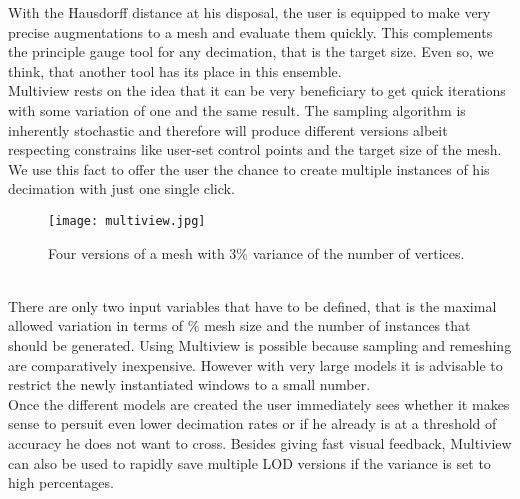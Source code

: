 With the Hausdorff distance at his disposal, the user is equipped to make very precise augmentations to a mesh and evaluate them quickly.
This complements the principle gauge tool for any decimation, that is the target size.
Even so, we think, that another tool has its place in this ensemble.\\
Multiview rests on the idea that it can be very beneficiary to get quick iterations with some variation of one and the same result.
The sampling algorithm is inherently stochastic and therefore will produce different versions albeit respecting constrains like user-set control points and the target size of the mesh.
We use this fact to offer the user the chance to create multiple instances of his decimation with just one single click.\\
\begin{figure}[ht]
\centering
\texttt{[image: multiview.jpg]}
\caption{Four versions of a mesh with 3\% variance of the number of vertices.}
\label{fig:multiview}
\end{figure}\\
There are only two input variables that have to be defined, that is the maximal allowed variation in terms of \% mesh size and the number of instances that should be generated.
Using Multiview is possible because sampling and remeshing are comparatively inexpensive.
However with very large models it is advisable to restrict the newly instantiated windows to a small number.\\
Once the different models are created the user immediately sees whether it makes sense to persuit even lower decimation rates or if he already is at a threshold of accuracy he does not want to cross.
Besides giving fast visual feedback, Multiview can also be used to rapidly save multiple LOD versions if the variance is set to high percentages.
